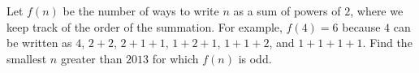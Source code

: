 Let $f(n)$ be the number of ways to write $n$ as a sum of powers of $2$, where we keep track of the order of the summation.  For example, $f(4)=6$ because $4$ can be written as $4$, $2+2$, $2+1+1$, $1+2+1$, $1+1+2$, and $1+1+1+1$.  Find the smallest $n$ greater than $2013$ for which $f(n)$ is odd.